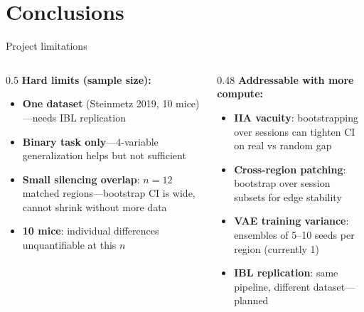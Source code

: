 \documentclass[aspectratio=169,11pt]{beamer}
\begin{document}
\section{Conclusions}

\begin{frame}{Project limitations}
\begin{columns}[T]
\begin{column}{0.5\textwidth}
\textbf{Hard limits (sample size):}
\begin{itemize}
  \item \textbf{One dataset} (Steinmetz 2019, 10 mice)---needs IBL replication
  \item \textbf{Binary task only}---4-variable generalization helps but not sufficient
  \item \textbf{Small silencing overlap}: $n = 12$ matched regions---bootstrap CI is wide, cannot shrink without more data
  \item \textbf{10 mice}: individual differences unquantifiable at this $n$
\end{itemize}
\end{column}
\begin{column}{0.48\textwidth}
\textbf{Addressable with more compute:}
\begin{itemize}
  \item \textbf{IIA vacuity}: bootstrapping over sessions can tighten CI on real vs random gap
  \item \textbf{Cross-region patching}: bootstrap over session subsets for edge stability
  \item \textbf{VAE training variance}: ensembles of 5--10 seeds per region (currently 1)
  \item \textbf{IBL replication}: same pipeline, different dataset---planned
\end{itemize}
\end{column}
\end{columns}
\end{frame}
\end{document}
